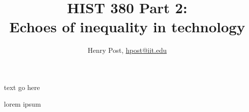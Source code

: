 \documentclass[a4paper,12pt]{article}
\title{HIST 380 Part 2: \\ Echoes of inequality in technology }
\author{Henry Post, \url{hpost@iit.edu}}
\begin{document}
\maketitle

\newpage

text go here

lorem ipsum


\newpage

\begin{thebibliography}{9}


\end{thebibliography}

\newpage

\end{document}
